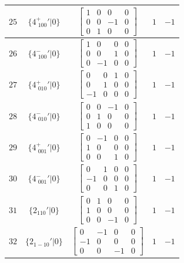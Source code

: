 \documentclass[fleqn,8pt]{jsarticle}
\begin{document}
\begin{longtable}{ccccc}
$ 25 $ & $ \{4^{+}_{\,\,100}{}'|0\} $ & $ \begin{bmatrix} 1 & 0 & 0 & 0 \\ 0 & 0 & -1 & 0 \\ 0 & 1 & 0 & 0 \end{bmatrix} $ & $ 1 $ & $ -1 $ \\ \hline
$ 26 $ & $ \{4^{-}_{\,\,100}{}'|0\} $ & $ \begin{bmatrix} 1 & 0 & 0 & 0 \\ 0 & 0 & 1 & 0 \\ 0 & -1 & 0 & 0 \end{bmatrix} $ & $ 1 $ & $ -1 $ \\ \hline
$ 27 $ & $ \{4^{+}_{\,\,010}{}'|0\} $ & $ \begin{bmatrix} 0 & 0 & 1 & 0 \\ 0 & 1 & 0 & 0 \\ -1 & 0 & 0 & 0 \end{bmatrix} $ & $ 1 $ & $ -1 $ \\ \hline
$ 28 $ & $ \{4^{-}_{\,\,010}{}'|0\} $ & $ \begin{bmatrix} 0 & 0 & -1 & 0 \\ 0 & 1 & 0 & 0 \\ 1 & 0 & 0 & 0 \end{bmatrix} $ & $ 1 $ & $ -1 $ \\ \hline
$ 29 $ & $ \{4^{+}_{\,\,001}{}'|0\} $ & $ \begin{bmatrix} 0 & -1 & 0 & 0 \\ 1 & 0 & 0 & 0 \\ 0 & 0 & 1 & 0 \end{bmatrix} $ & $ 1 $ & $ -1 $ \\ \hline
$ 30 $ & $ \{4^{-}_{\,\,001}{}'|0\} $ & $ \begin{bmatrix} 0 & 1 & 0 & 0 \\ -1 & 0 & 0 & 0 \\ 0 & 0 & 1 & 0 \end{bmatrix} $ & $ 1 $ & $ -1 $ \\ \hline
$ 31 $ & $ \{2{}_{110}{}'|0\} $ & $ \begin{bmatrix} 0 & 1 & 0 & 0 \\ 1 & 0 & 0 & 0 \\ 0 & 0 & -1 & 0 \end{bmatrix} $ & $ 1 $ & $ -1 $ \\ \hline
$ 32 $ & $ \{2{}_{1-10}{}'|0\} $ & $ \begin{bmatrix} 0 & -1 & 0 & 0 \\ -1 & 0 & 0 & 0 \\ 0 & 0 & -1 & 0 \end{bmatrix} $ & $ 1 $ & $ -1 $ \\ \hline

\end{longtable}
\end{document}
